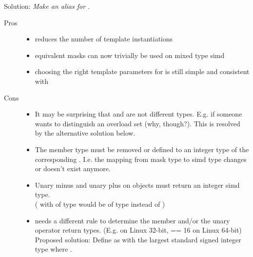 Solution: \emph{Make \mask[<T, Abi>] an alias for .}

\begin{description}
  \item[Pros]
    \begin{itemize}
      \item reduces the number of template instantiations

      \item equivalent masks can now trivially be used on mixed type simd

      \item choosing the right template parameters for \mask is still simple
        and consistent with \simd
    \end{itemize}

  \item[Cons]
    \begin{itemize}
      \item It may be surprising that \mask[<T, Abi>] and \mask[<U, Abi>] are
        not different types.
        E.g. if someone wants to distinguish an overload set (why, though?).
        This is resolved by the alternative solution below.

      \item The  member type must be removed or
        defined to an integer type of the corresponding .
        I.e. the mapping from mask type to simd type changes or doesn't exist
        anymore.

      \item Unary minus and unary plus on \mask objects must return an integer
        simd type.\\
        ( with  of type  would be of
        type  instead of )

      \item {} needs a different rule to
        determine the  member and/or the unary operator return
        types.
        (E.g.  on Linux 32-bit,
         == 16 on Linux 64-bit)
        Proposed solution: Define  as
         with  the largest standard signed integer
        type where .
    \end{itemize}
\end{description}

